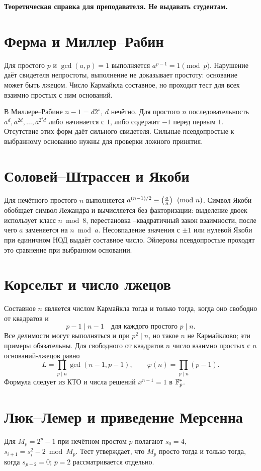 \documentclass[12pt]{ca-capstone}
\begin{document}
\begin{center}\textbf{Теоретическая справка для преподавателя. Не выдавать студентам.}\end{center}

\section{Ферма и Миллер--Рабин}
Для простого $p$ и $\gcd(a,p)=1$ выполняется $a^{p-1}=1\pmod p$. Нарушение даёт свидетеля
непростоты, выполнение не доказывает простоту: основание может быть лжецом. Число Кармайкла
составное, но проходит тест для всех взаимно простых с ним оснований.

В Миллере--Рабине $n-1=d2^s$, $d$ нечётно. Для простого $n$ последовательность
$a^{d},a^{2d},\ldots,a^{2^{s}d}$ либо начинается с $1$, либо содержит $-1$ перед первым $1$.
Отсутствие этих форм даёт сильного свидетеля. Сильные псевдопростые к выбранному основанию
нужны для проверки ложного принятия.

\section{Соловей--Штрассен и Якоби}
Для нечётного простого $n$ выполняется $a^{(n-1)/2}\equiv\left(\frac{a}{n}\right)\pmod n$. Символ Якоби
обобщает символ Лежандра и вычисляется без факторизации: выделение двоек использует класс
$n\bmod8$, перестановка --квадратичный закон взаимности, после чего $a$ заменяется на
$n\bmod a$. Несовпадение значения с $\pm1$ или нулевой Якоби при единичном НОД выдаёт составное
число. Эйлеровы псевдопростые проходят это сравнение при выбранном основании.

\section{Корсельт и число лжецов}
Составное $n$ является числом Кармайкла тогда и только тогда, когда оно свободно от квадратов и
\[
 p-1\mid n-1\quad\text{для каждого простого }p\mid n.
\]
Все делимости могут выполняться и при $p^2\mid n$, но такое $n$ не Кармайклово; эти примеры
обязательны. Для свободного от квадратов $n$ число взаимно простых с $n$ оснований-лжецов равно
\[
 L=\prod_{p\mid n}\gcd(n-1,p-1),\qquad \varphi(n)=\prod_{p\mid n}(p-1).
\]
Формула следует из КТО и числа решений $x^{n-1}=1$ в $\mathbb{F}_{p}^*$.

\section{Люк--Лемер и приведение Мерсенна}
Для $M_p=2^p-1$ при нечётном простом $p$ полагают $s_0=4$,
$s_{i+1}=s_i^2-2\bmod M_p$. Тест утверждает, что $M_p$ просто тогда и только тогда, когда
$s_{p-2}=0$; $p=2$ рассматривается отдельно.
\end{document}
